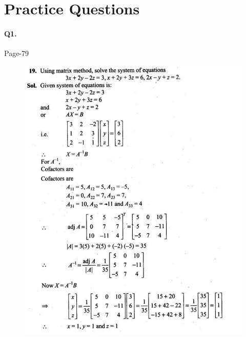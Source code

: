 \documentclass{article}
\begin{document}
\section*{Practice Questions}
\paragraph{Q1.}
\begin{flushright}
Page-79
\end{flushright}
\begin{figure}[H]
    \includegraphics[scale=0.5]{determinants_l3_ps_3.png}
\end{figure}
\clearpage
\end{document}
